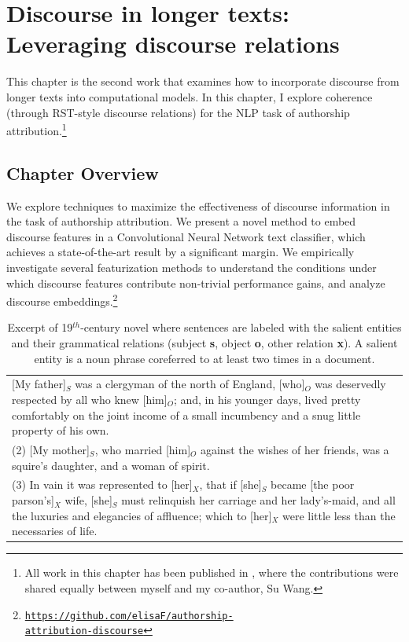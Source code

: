 \chapter{Discourse in longer texts: Leveraging discourse relations}
\label{ch:longertexts2}
This chapter is the second work that examines how to incorporate discourse from longer texts into computational models. In this chapter, I explore coherence (through RST-style discourse relations) for the NLP task of authorship attribution.\footnote{All work in this chapter has been published in , where the contributions were shared equally between myself and my co-author, Su Wang.}

\section{Chapter Overview}
We explore techniques to maximize the effectiveness of discourse information in the task of authorship attribution. 
We present a novel method to embed discourse features in a Convolutional Neural Network text classifier, which achieves a state-of-the-art result by a significant margin.
We empirically investigate several featurization methods to understand the conditions under which discourse features contribute non-trivial performance gains, and analyze discourse embeddings.\footnote{\href{http://github.com/elisaF/authorship-attribution-discourse}{\tt{https://github.com/elisaF/authorship-\\attribution-discourse}}}

\vspace{-.5em}
\begin{table}[t]
\centering
\begin{tabular}{p{10.5cm}}
\toprule(1) [My father]$_S$ was a clergyman of the north of England, [who]$_O$ was deservedly respected by all who knew [him]$_O$; and, in his younger days, lived pretty comfortably on the joint income of a small incumbency and a snug little property of his own. \\
(2) [My mother]$_S$, who married [him]$_O$ against the wishes of her friends, was a squire's daughter, and a woman of spirit. \\  
(3) In vain it was represented to [her]$_X$, that if [she]$_S$ became [the poor parson's]$_X$ wife, [she]$_S$ must relinquish her carriage and her lady's-maid, and all the luxuries and elegancies of affluence; which to [her]$_X$ were little less than the necessaries of life.\\\bottomrule
\end{tabular}
\vspace{-.8em}
\caption{\label{tab:sents} Excerpt of 19$^{th}$-century novel where sentences are labeled with the salient entities and their grammatical relations (subject \textbf{s}, object \textbf{o}, other relation \textbf{x}). A salient entity is a noun phrase coreferred to at least two times in a document.}
\end{table}

